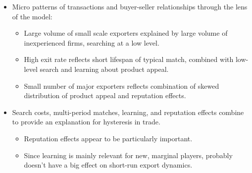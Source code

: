 \documentclass[notes=show]{beamer}
\begin{document}
\begin{frame}%



\end{frame}%
\begin{frame}%


\begin{itemize}
\item Micro patterns of transactions and buyer-seller relationships through
the lens of the model:

\begin{itemize}
\item Large volume of small scale exporters explained by large volume of
inexperienced firms, searching at a low level.

\item High exit rate reflects short lifespan of typical match, combined with
low-level search and learning about product appeal.

\item Small number of major exporters reflects combination of skewed
distribution of product appeal and reputation effects.
\end{itemize}

\item Search costs, multi-period matches, learning, and reputation effects
combine to provide an explanation for hysteresis in trade.

\begin{itemize}
\item Reputation effects appear to be particularly important.

\item Since learning is mainly relevant for new, marginal players, probably
doesn't have a big effect on short-run export dynamics.
\end{itemize}
\end{itemize}

\end{frame}%
\end{document}
